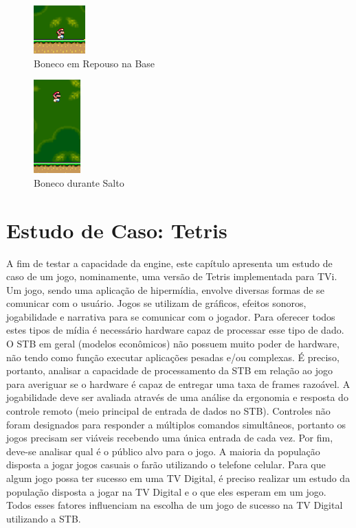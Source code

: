 \documentclass[
	12pt,				%
	openright,			%
	oneside,			%
	a4paper,			%
	brazil,				%
	]{abntex2}
\begin{document}
\begin{figure}
\centering
\includegraphics{img_ex_2.png}
\caption{Boneco em Repouso na Base}
\label{fig:imgEx2}
\end{figure}

\begin{figure}
\centering
\includegraphics{img_ex_3.png}
\caption{Boneco durante Salto}
\label{fig:imgEx3}
\end{figure}


\chapter{Estudo de Caso: Tetris}

A fim de testar a capacidade da engine, este capítulo apresenta um estudo de caso de um jogo, nominamente, uma versão de Tetris implementada para TVi. Um jogo, sendo uma aplicação de hipermídia, envolve diversas formas de se comunicar com o usuário. Jogos se utilizam de gráficos, efeitos sonoros, jogabilidade e narrativa para se comunicar com o jogador. Para oferecer todos estes tipos de mídia é necessário hardware capaz de processar esse tipo de dado. O STB em geral (modelos econômicos) não possuem muito poder de hardware, não tendo como função executar aplicações pesadas e/ou complexas. É preciso, portanto, analisar a capacidade de processamento da STB em relação ao jogo para averiguar se o hardware é capaz de entregar uma taxa de frames razoável. A jogabilidade deve ser avaliada através de uma análise da ergonomia e resposta do controle remoto (meio principal de entrada de dados no STB). Controles não foram designados para responder a múltiplos comandos simultâneos, portanto os jogos precisam ser viáveis recebendo uma única entrada de cada vez. Por fim, deve-se analisar qual é o público alvo para o jogo. A maioria da população disposta a jogar jogos casuais o farão utilizando o telefone celular. Para que algum jogo possa ter sucesso em uma TV Digital, é preciso realizar um estudo da população disposta a jogar na TV Digital e o que eles esperam em um jogo. Todos esses fatores influenciam na escolha de um jogo de sucesso na TV Digital utilizando a STB.
\end{document}
